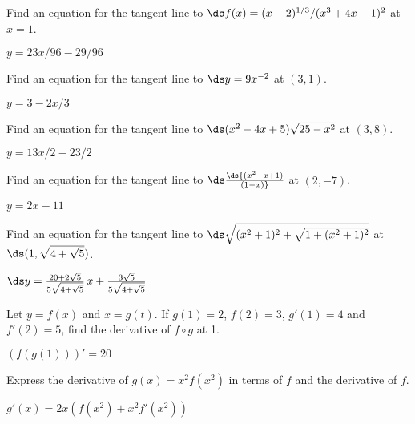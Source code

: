 \begin{enumialphparenastyle}
\begin{ex}   Find an equation for the tangent line to 
$\ds f(x) = (x-2)^{1/3}/(x^3 + 4x - 1)^2$ at $x=1$.
\begin{sol} 
$y=23x/96-29/96$
\end{sol}
\end{ex}

\begin{ex}  Find an equation for the tangent line to $\ds y=9x^{-2}$ at $(3,1)$.
\begin{sol} 
$y=3-2x/3$
\end{sol}
\end{ex}

\begin{ex}  Find an equation for the tangent line to $\ds (x^2-4x+5)\sqrt{25-x^2}$ 
at $(3,8)$.
\begin{sol} 
$y=13x/2-23/2$
\end{sol}
\end{ex}

\begin{ex}  Find an equation for the tangent line to $\ds \ds{(x^2+x+1)\over(1-x)}$ 
at $(2,-7)$.
\begin{sol} 
$y=2x-11$
\end{sol}
\end{ex}

\begin{ex}  Find an equation for the tangent line to 
$\ds \sqrt{(x^2+1)^2+\sqrt{1+(x^2+1)^2}}$
at $\ds (1,\sqrt{4+\sqrt{5}})$.
\begin{sol} 
$\ds y={20+2\sqrt5\over5\sqrt{4+\sqrt5}}\,x+{3\sqrt5\over5\sqrt{4+\sqrt5}}$
\end{sol}
\end{ex}

\begin{ex}
Let $y=f(x)$ and $x=g(t)$. If $g(1)=2$, $f(2)=3$, $g'(1)=4$ and $f'(2)=5$, find the derivative of $f\circ g$ at 1.
\begin{sol}
	$(f(g(1)))'=20$
\end{sol}
\end{ex}

\begin{ex}
Express the derivative of $g(x)=x^2f(x^2)$ in terms of $f$ and the derivative of $f$.
\begin{sol}
	$g'(x)=2x(f(x^2)+x^2f'(x^2))$
\end{sol}
\end{ex}

\end{enumialphparenastyle}